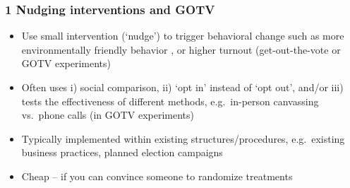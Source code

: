 \documentclass[12pt,english,dvipsnames,aspectratio=169,handout]{beamer}\usepackage[]{graphicx}\usepackage[]{xcolor}
\begin{document}
\begin{frame}
	\frametitle{1 Nudging interventions and GOTV}
	\footnotesize
\begin{itemize}
  \item Use small intervention (`nudge') to trigger behavioral change such as more environmentally friendly behavior \cite{nolan_normative_2008}, or higher turnout (get-out-the-vote or GOTV experiments) \cite{gerber_social_2008}
  \item Often uses i) social comparison, ii) `opt in' instead of `opt out', and/or iii) tests the effectiveness of different methods, e.g.\ in-person canvassing vs.\ phone calls (in GOTV experiments)
  \item Typically implemented within existing structures/procedures, e.g.\ existing business practices, planned election campaigns
  \item Cheap -- if you can convince someone to randomize treatments 
\end{itemize}
\vspace{3cm}
\end{frame}
\end{document}
